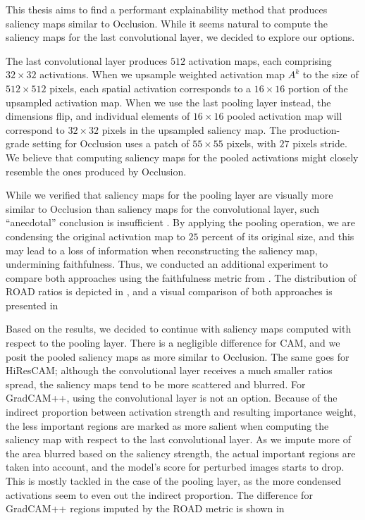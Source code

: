This thesis aims to find a performant explainability method that produces saliency maps similar to Occlusion.
While it seems natural to compute the saliency maps for the last convolutional layer, we decided to explore our options.

The last convolutional layer produces $512$ activation maps, each comprising $32 \times 32$ activations.
When we upsample weighted activation map $A^k$ to the size of $512 \times 512$ pixels, each spatial activation corresponds to a $16 \times 16$ portion of the upsampled activation map.
When we use the last pooling layer instead, the dimensions flip, and individual elements of $16 \times 16$ pooled activation map will correspond to $32 \times 32$ pixels in the upsampled saliency map.
The production-grade setting for Occlusion uses a patch of $55 \times 55$ pixels, with $27$ pixels stride.
We believe that computing saliency maps for the pooled activations might closely resemble the ones produced by Occlusion.

While we verified that saliency maps for the pooling layer are visually more similar to Occlusion than saliency maps for the convolutional layer, such ``anecdotal'' conclusion is insufficient \cite{xai-anecdotal-evidence}.
By applying the pooling operation, we are condensing the original activation map to $25$ percent of its original size, and this may lead to a loss of information when reconstructing the saliency map, undermining faithfulness.
Thus, we conducted an additional experiment to compare both approaches using the faithfulness metric from .
The distribution of ROAD ratios is depicted in , and a visual comparison of both approaches is presented in 

Based on the results, we decided to continue with saliency maps computed with respect to the pooling layer.
There is a negligible difference for CAM, and we posit the pooled saliency maps as more similar to Occlusion.
The same goes for HiResCAM; although the convolutional layer receives a much smaller ratios spread, the saliency maps tend to be more scattered and blurred.
For GradCAM++, using the convolutional layer is not an option.
Because of the indirect proportion between activation strength and resulting importance weight, the less important regions are marked as more salient when computing the saliency map with respect to the last convolutional layer.
As we impute more of the area blurred based on the saliency strength, the actual important regions are taken into account, and the model's score for perturbed images starts to drop.
This is mostly tackled in the case of the pooling layer, as the more condensed activations seem to even out the indirect proportion. 
The difference for GradCAM++ regions imputed by the ROAD metric is shown in 

